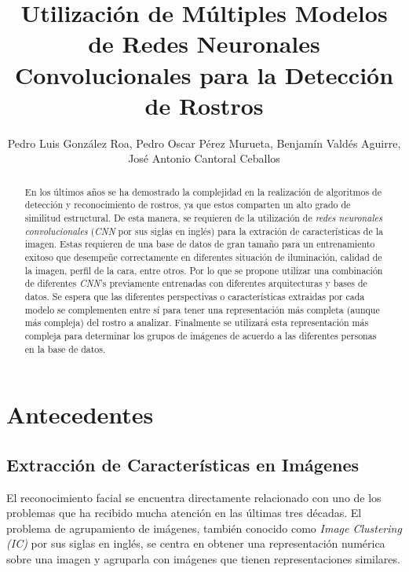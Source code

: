 \documentclass[a4paper, 10pt, conference]{ieeeconf}      %
\title{\LARGE \bf
    Utilización de Múltiples Modelos de Redes Neuronales Convolucionales
    para la Detección de Rostros
}
\author{Pedro Luis González Roa, Pedro Oscar Pérez Murueta, Benjamín Valdés Aguirre,
José Antonio Cantoral Ceballos}
\begin{document}
    \maketitle
    \thispagestyle{empty}
    \pagestyle{empty}

    \begin{abstract}
        En los últimos años se ha demostrado la complejidad en la realización de
        algoritmos de detección y reconocimiento de rostros, ya que estos comparten
        un alto grado de similitud estructural. De esta manera, se requieren de la
        utilización de \textit{redes neuronales convolucionales} (\textit{CNN} por sus siglas
        en inglés) para la extración de características de la imagen.
        Estas requieren de una base de datos de gran tamaño para un
        entrenamiento exitoso que desempeñe correctamente en diferentes situación de
        iluminación, calidad de la imagen, perfil de la cara, entre otros.
        Por lo que se propone utilizar una combinación de diferentes
        \textit{CNN}'s previamente entrenadas con diferentes arquitecturas y bases de datos.
        Se espera que las diferentes perspectivas o características extraidas por cada modelo
        se complementen entre sí para tener una representación más completa (aunque
        más compleja) del rostro a analizar. Finalmente se utilizará esta representación
        más compleja para determinar los grupos de imágenes de acuerdo a las diferentes personas
        en la base de datos.
    \end{abstract}

    \section{Antecedentes}

    \subsection{Extracción de Características en Imágenes}
    El reconocimiento facial se encuentra directamente relacionado con uno de los
    problemas que ha recibido mucha atención en las últimas tres décadas. El problema
    de agrupamiento de imágenes, también conocido como \textit{Image Clustering (IC)}
    por sus siglas en inglés, se centra en obtener una representación numérica sobre
    una imagen y agruparla con imágenes que tienen representaciones similares.
    \cite{CombiningCNN}
\end{document}
